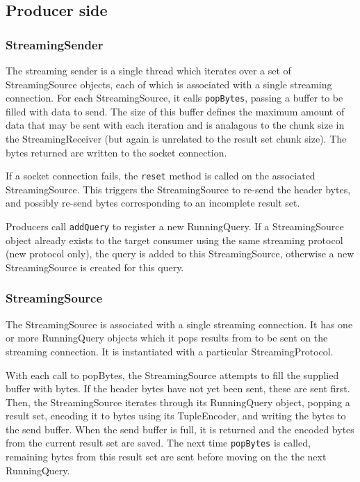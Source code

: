 \subsection{Producer side}

\subsubsection*{StreamingSender}



The streaming sender is a single thread which iterates over a set of
StreamingSource objects, each of which is associated with a single streaming
connection. For each StreamingSource, it calls \texttt{popBytes}, passing a buffer
to be filled with data to send. The size of this buffer defines the maximum 
amount of data that may be sent with each iteration and is analagous to the
chunk size in the StreamingReceiver (but again is unrelated to the result
set chunk size). The bytes returned are written to the socket connection.

If a socket connection fails, the \texttt{reset} method is called on
the associated StreamingSource. This triggers the StreamingSource to
re-send the header bytes, and possibly re-send bytes corresponding to 
an incomplete result set.

Producers call \texttt{addQuery} to register a new RunningQuery. If 
a StreamingSource object already exists to the target consumer using
the same streaming protocol (new protocol only), the query is added
to this StreamingSource, otherwise a new StreamingSource is created
for this query.

\subsubsection*{StreamingSource}


The StreamingSource is associated with a single streaming connection.
It has one or more RunningQuery objects which it pops results from
to be sent on the streaming connection. It is instantiated with a 
particular StreamingProtocol.

With each call to popBytes, the StreamingSource attempts to fill
the supplied buffer with bytes. If the header bytes have not
yet been sent, these are sent first. Then, the StreamingSource
iterates through its RunningQuery object, popping a result set, 
encoding it to bytes using its TupleEncoder, and writing the bytes
to the send buffer. When the send buffer is full, it is returned
and the encoded bytes from the current result set are saved. The next
time \texttt{popBytes} is called, remaining bytes from this result set
are sent before moving on the the next RunningQuery.


